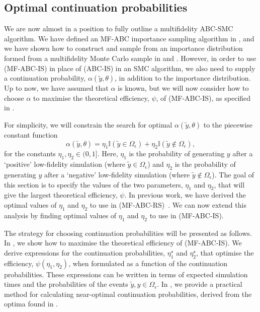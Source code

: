 \documentclass[review]{siamonline190516}
\begin{document}
\subsection{Optimal continuation probabilities}
\label{s:eta}

We are now almost in a position to fully outline a multifidelity ABC-SMC algorithm.
We have defined an MF-ABC importance sampling algorithm in , and we have shown how to construct and sample from an importance distribution formed from a multifidelity Monte Carlo sample in  and .
However, in order to use  (MF-ABC-IS) in place of  (ABC-IS) in an SMC algorithm, we also need to supply a continuation probability, $\alpha(\tilde y, \theta)$, in addition to the importance distribution.
Up to now, we have assumed that $\alpha$ is known, but we will now consider how to choose $\alpha$ to maximise the theoretical efficiency, $\psi$, of  (MF-ABC-IS), as specified in .

For simplicity, we will constrain the search for optimal $\alpha(\tilde y, \theta)$ to the piecewise constant function
\begin{equation}
\label{eq:constantrates}
 \alpha(\tilde y, \theta) = \eta_1 \mathbb I(\tilde y \in \Omega_{\epsilon}) + \eta_2 \mathbb I(\tilde y \notin \Omega_{\epsilon}),
\end{equation}
for the constants $\eta_1, \eta_2 \in (0,1]$.
Here, $\eta_1$ is the probability of generating $y$ after a `positive' low-fidelity simulation (where $\tilde y \in \Omega_\epsilon$) and $\eta_2$ is the probability of generating $y$ after a `negative' low-fidelity simulation (where $\tilde y \notin \Omega_\epsilon$).
The goal of this section is to specify the values of the two parameters, $\eta_1$ and $\eta_2$, that will give the largest theoretical efficiency, $\psi$.
In previous work, we have derived the optimal values of $\eta_1$ and $\eta_2$ to use in  (MF-ABC-RS)~\cite{Prescott2020}.
We can now extend this analysis by finding optimal values of $\eta_1$ and $\eta_2$ to use in  (MF-ABC-IS).

The strategy for choosing continuation probabilities will be presented as follows.
In , we show how to maximise the theoretical efficiency of  (MF-ABC-IS).
We derive expressions for the continuation probabilities, $\eta_1^\star$ and $\eta_2^\star$, that optimise the efficiency, $\psi(\eta_1,\eta_2)$, when formulated as a function of the continuation probabilities.
These expressions can be written in terms of expected simulation times and the probabilities of the events $\tilde y, y \in \Omega_\epsilon$.
In , we provide a practical method for calculating near-optimal continuation probabilities, derived from the optima found in .
\end{document}
